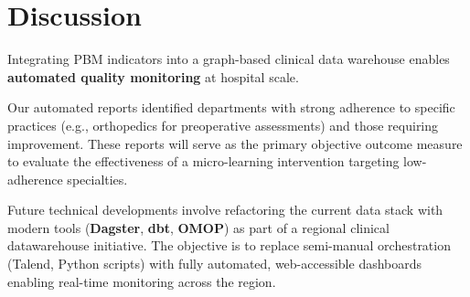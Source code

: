 \documentclass{IOS-Book-Article}
\begin{document}
\section{Discussion}

Integrating PBM indicators into a graph-based clinical data warehouse enables
 \textbf{automated quality monitoring} at hospital scale.

Our automated reports identified departments with strong adherence to specific practices 
(e.g., orthopedics for preoperative assessments) and those requiring improvement. 
These reports will serve as the primary objective outcome measure to evaluate the 
effectiveness of a micro-learning intervention targeting low-adherence specialties.

Future technical developments involve refactoring the current data stack with modern 
tools (\textbf{Dagster}, \textbf{dbt}, \textbf{OMOP}) as part of a regional clinical 
datawarehouse initiative. The objective is to replace semi-manual orchestration 
(Talend, Python scripts) with fully automated, web-accessible dashboards enabling 
real-time monitoring across the region.
\end{document}

